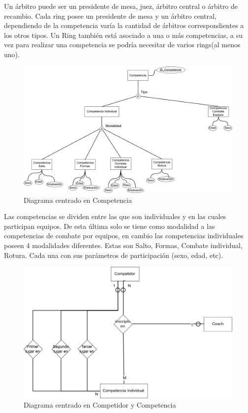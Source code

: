 Un árbitro puede ser un presidente de mesa, juez, árbitro central o árbitro de recambio. Cada ring posee un presidente de mesa
y un árbitro central, dependiendo de la competencia varía la cantidad de árbitros correspondientes a los otros tipos.
Un Ring también está asociado a una o más competencias, a su vez para realizar una competencia se podría necesitar de  varios
rings(al menos uno).

\begin{figure}[H]
  \centering
    \includegraphics[scale=0.3]{imagenes/Competencia.png}
  \caption{Diagrama centrado en Competencia}
\end{figure}

Las competencias se dividen entre las que son individuales y en las cuales participan equipos. De esta última solo se tiene
 como modalidad a las competencias de combate por equipos, en cambio las competencias individuales poseen 4
 modalidades diferentes. Estas son Salto, Formas, Combate individual, Rotura. Cada una con sus parámetros de participación
 (sexo, edad, etc).

\begin{figure}[H]
  \centering
    \includegraphics[scale=0.5]{imagenes/CompetidorCompetencia.png}
  \caption{Diagrama centrado en Competidor y Competencia}
\end{figure}


